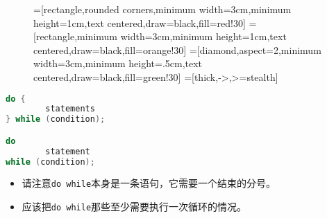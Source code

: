 \begin{frame}[fragile]\ft{\secname}
\begin{figure}
\centering
{}=[rectangle,rounded corners,minimum width=3cm,minimum height=1cm,text centered,draw=black,fill=red!30]
=[rectangle,minimum width=3cm,minimum height=1cm,text centered,draw=black,fill=orange!30]
=[diamond,aspect=2,minimum width=3cm,minimum height=.5cm,text centered,draw=black,fill=green!30]
=[thick,->,>=stealth]


\end{figure}

\end{frame}

\begin{frame}[fragile]\ft{\secname}
\begin{lstlisting}[language=c,frame=single]
do {
        statements
} while (condition);

do 
        statement 
while (condition);
\end{lstlisting}

\end{frame}

\begin{frame}[fragile]\ft{\secname}

\begin{itemize}
\item
请注意\lstinline|do while|本身是一条语句，它需要一个结束的分号。\\[0.1in]
\item
应该把\lstinline|do while|那些至少需要执行一次循环的情况。
\end{itemize}
\end{frame}



 

